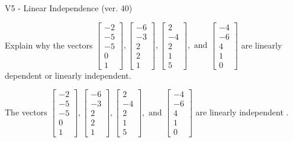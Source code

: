 \begin{exercise}
  \begin{exerciseTitle}V5 - Linear Independence (ver. 40)\end{exerciseTitle}
  \begin{exerciseStatement}
    Explain why the vectors \(\left[\begin{array}{r}
-2 \\
-5 \\
-5 \\
0 \\
1
\end{array}\right] , \left[\begin{array}{r}
-6 \\
-3 \\
2 \\
2 \\
1
\end{array}\right] , \left[\begin{array}{r}
2 \\
-4 \\
2 \\
1 \\
5
\end{array}\right] , \text{ and } \left[\begin{array}{r}
-4 \\
-6 \\
4 \\
1 \\
0
\end{array}\right]\) are linearly dependent or linearly independent.	


  \end{exerciseStatement}
  \begin{exerciseAnswer}
   The vectors \(\left[\begin{array}{r}
-2 \\
-5 \\
-5 \\
0 \\
1
\end{array}\right] , \left[\begin{array}{r}
-6 \\
-3 \\
2 \\
2 \\
1
\end{array}\right] , \left[\begin{array}{r}
2 \\
-4 \\
2 \\
1 \\
5
\end{array}\right] , \text{ and } \left[\begin{array}{r}
-4 \\
-6 \\
4 \\
1 \\
0
\end{array}\right]\) are 
  	 linearly independent  .
  


  \end{exerciseAnswer}
\end{exercise}